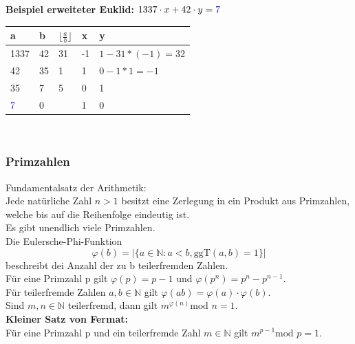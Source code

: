\documentclass[a4paper,12pt,leqno]{article}
\newcommand{\blue}[1]{\textcolor{blue}{#1}}
\begin{document}
\textbf{Beispiel erweiteter Euklid:}
$1337\cdot x+42\cdot y=\blue{7}$\\
\begin{tabular}{|l|l|l|l|l|}
a & b & $\lfloor \frac{a}{b} \rfloor$ & x & y\\
\hline
1337 & 42 & 31 & -1 & $1-31*(-1)=32$\\
\hline
42 & 35 & 1 & 1 & $0-1*1=-1$\\
\hline
35 & 7 & 5 & 0 & 1\\
\hline
\blue{7} & 0 & & 1 & 0
\end{tabular}\\
\subsubsection{Primzahlen}
Fundamentalsatz der Arithmetik:\\
Jede natürliche Zahl $n>1$ besitzt eine Zerlegung in ein Produkt aus Primzahlen, welche bis auf die Reihenfolge eindeutig ist.\\
Es gibt unendlich viele Primzahlen.\\

Die Eulersche-Phi-Funktion $$\varphi (b)=|\{a\in\mathbb{N} : a < b, \textrm{ggT}(a,b)=1\}|$$ beschreibt dei Anzahl der zu b teilerfremden Zahlen.\\
Für eine Primzahl p gilt $\varphi (p)=p-1$ und $\varphi (p^n)=p^n-p^{n-1}$.\\
Für teilerfremde Zahlen $a,b\in \mathbb{N}$ gilt $\varphi (ab)=\varphi (a)\cdot \varphi (b)$.\\
Sind $m,n\in \mathbb{N}$ teilerfremd, dann gilt $m^{\varphi (n)}\textrm{mod }n= 1$.\\
\textbf{Kleiner Satz von Fermat:}\\
Für eine Primzahl p und ein teilerfremde Zahl $m\in \mathbb{N}$ gilt $m^{p-1} \textrm{mod }p = 1$.
\end{document}
